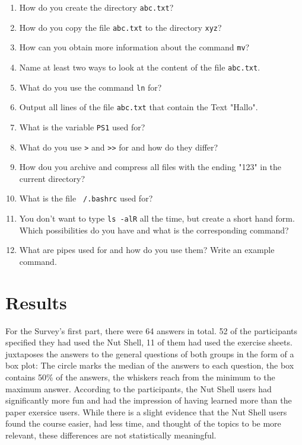 \documentclass[paper=a4,twoside,abstract=on,cleardoublepage=empty,numbers=noenddot,toc=bib,11pt,appendixprefix=true]{scrreprt}
\begin{document}
\begin{enumerate}
    \item How do you create the directory \texttt{abc.txt}?
    \item How do you copy the file \texttt{abc.txt} to the directory \texttt{xyz}?
    \item How can you obtain more information about the command \texttt{mv}?
    \item Name at least two ways to look at the content of the file \texttt{abc.txt}.
    \item What do you use the command \texttt{ln} for?
    \item Output all lines of the file \texttt{abc.txt} that contain the Text "Hallo".
    \item What is the variable \texttt{PS1} used for?
    \item What do you use \texttt{>} and \texttt{>>} for and how do they differ?
    \item How dou you archive and compress all files with the ending "123" in the current directory?
    \item What is the file \texttt{~/.bashrc} used for?
    \item You don't want to type \texttt{ls -alR} all the time, but create a short hand form. Which possibilities do you have and what is the corresponding command?
    \item What are pipes used for and how do you use them? Write an example command.
\end{enumerate}

\section{Results}

For the Survey's first part, there were 64 answers in total. 52 of the participants specified they had used the Nut Shell, 11 of them had used the exercise sheets.  juxtaposes the answers to the general questions of both groups in the form of a box plot: The circle marks the median of the answers to each question, the box contains 50\% of the answers, the whiskers reach from the minimum to the maximum answer. According to the participants, the Nut Shell users had significantly more fun and had the impression of having learned more than the paper exersice users. While there is a slight evidence that the Nut Shell users found the course easier, had less time, and thought of the topics to be more relevant, these differences are not statistically meaningful.
\end{document}
